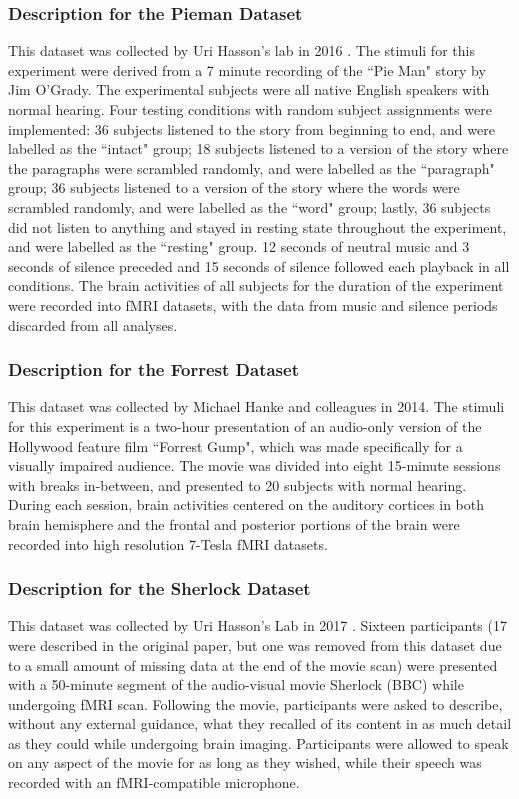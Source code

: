 \documentclass[11pt]{article}
\begin{document}
\subsubsection{Description for the Pieman Dataset}
This dataset was collected by Uri Hasson's lab in 2016 \citep{hasson2016}. The stimuli for this experiment were derived from a 7 minute recording of the ``Pie Man" story by Jim O'Grady. The experimental subjects were all native English speakers with normal hearing. Four testing conditions with random subject assignments were implemented: 36 subjects listened to the story from beginning to end, and were labelled as the ``intact" group; 18 subjects listened to a version of the story where the paragraphs were scrambled randomly, and were labelled as the ``paragraph" group; 36 subjects listened to a version of the story where the words were scrambled randomly, and were labelled as the ``word" group; lastly, 36 subjects did not listen to anything and stayed in resting state throughout the experiment, and were labelled as the ``resting" group. 12 seconds of neutral music and 3 seconds of silence preceded and 15 seconds of silence followed each playback in all conditions. The brain activities of all subjects for the duration of the experiment were recorded into fMRI datasets, with the data from music and silence periods discarded from all analyses.

\subsubsection{Description for the Forrest Dataset}
This dataset was collected by Michael Hanke and colleagues in 2014\citep{Hanke2014}. The stimuli for this experiment is a two-hour presentation of an audio-only version of the Hollywood feature film ``Forrest Gump", which was made specifically for a visually impaired audience. The movie was divided into eight 15-minute sessions with breaks in-between, and presented to 20 subjects with normal hearing. During each session, brain activities centered on the auditory cortices in both brain hemisphere and the frontal and posterior portions of the brain were recorded into high resolution 7-Tesla fMRI datasets.

\subsubsection{Description for the Sherlock Dataset}
This dataset was collected by Uri Hasson's Lab in 2017 \citep{Chen2017}. Sixteen participants (17 were described in the original paper, but one was removed from this dataset due to a small amount of missing data at the end of the movie scan) were presented with a 50-minute segment of the audio-visual movie Sherlock (BBC) while undergoing fMRI scan. Following the movie, participants were asked to describe, without any external guidance, what they recalled of its content in as much detail as they could while undergoing brain imaging. Participants were allowed to speak on any aspect of the movie for as long as they wished, while their speech was recorded with an fMRI-compatible microphone.
\end{document}
